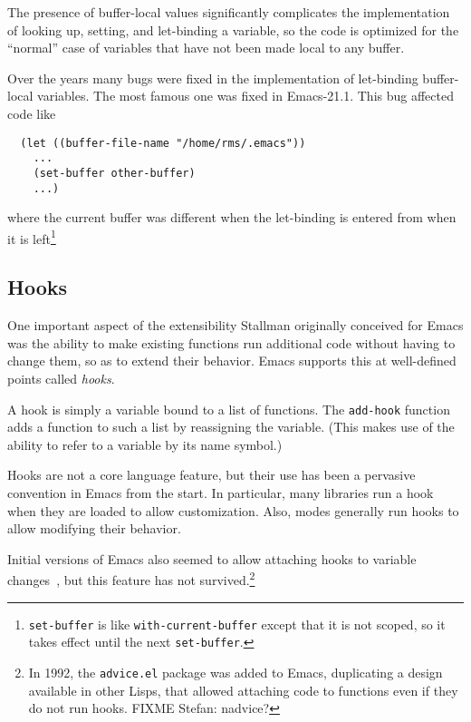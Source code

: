 \documentclass[format=acmsmall, review=false, screen=true]{acmart}
\begin{document}
The presence of buffer-local values significantly complicates the
implementation of looking up, setting, and let-binding a variable, so the
code is optimized for the ``normal'' case of variables that have not been
made local to any buffer.

Over the years many bugs were fixed in the implementation of let-binding
buffer-local variables.  The most famous one was fixed in Emacs-21.1.
This bug affected code like
\begin{verbatim}
  (let ((buffer-file-name "/home/rms/.emacs"))
    ...
    (set-buffer other-buffer)
    ...)
\end{verbatim}
where the current buffer was different when the let-binding is entered from
when it is left\footnote{\texttt{set-buffer} is like
  \texttt{with-current-buffer} except that it is not scoped, so it takes
  effect until the next \texttt{set-buffer}.}

\subsection{Hooks}
\label{sec:hooks}

One important aspect of the extensibility Stallman originally
conceived for Emacs was the ability to make existing functions run
additional code without having to change them, so as to extend their
behavior.  Emacs supports this at well-defined points called
\emph{hooks}.

A hook is simply a variable bound to a list of functions.  The
\texttt{add-hook} function adds a function to such a list by
reassigning the variable.  (This makes use of the ability to refer to
a variable by its name symbol.)

Hooks are not a core language feature, but their use has been a
pervasive convention in Emacs from the start.  In particular, many
libraries run a hook when they are loaded to allow customization.
Also, modes generally run hooks to allow modifying their behavior.

Initial versions of Emacs also seemed to allow attaching hooks to
variable changes~\cite{Stallman1981}, but this feature has not
survived.\footnote{In 1992, the \texttt{advice.el} package was added
  to Emacs, duplicating a design available in other Lisps, that
  allowed attaching code to functions even if they do not run hooks.
  FIXME Stefan: nadvice?}
\end{document}
